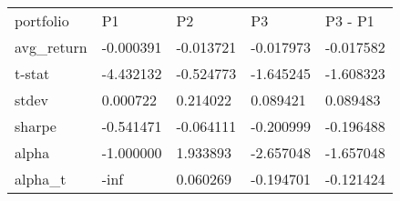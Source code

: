 \begin{tabular}{lllll}
\toprule
\midrule
portfolio & P1 & P2 & P3 & P3 - P1 \\
avg_return & -0.000391 & -0.013721 & -0.017973 & -0.017582 \\
t-stat & -4.432132 & -0.524773 & -1.645245 & -1.608323 \\
stdev & 0.000722 & 0.214022 & 0.089421 & 0.089483 \\
sharpe & -0.541471 & -0.064111 & -0.200999 & -0.196488 \\
alpha & -1.000000 & 1.933893 & -2.657048 & -1.657048 \\
alpha_t & -inf & 0.060269 & -0.194701 & -0.121424 \\
\bottomrule
\end{tabular}
